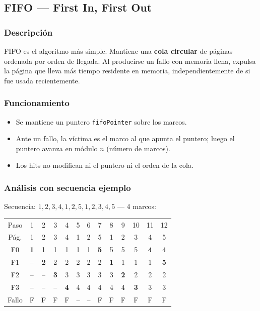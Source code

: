 \documentclass[12pt, a4paper]{article}
\begin{document}
\subsection{FIFO — First In, First Out}

\subsubsection{Descripción}

FIFO es el algoritmo más simple. Mantiene una \textbf{cola circular} de páginas ordenada por orden de llegada. Al producirse un fallo con memoria llena, expulsa la página que lleva más tiempo residente en memoria, independientemente de si fue usada recientemente.

\subsubsection{Funcionamiento}

\begin{itemize}
  \item Se mantiene un puntero \texttt{fifoPointer} sobre los marcos.
  \item Ante un fallo, la víctima es el marco al que apunta el puntero; luego el puntero avanza en módulo \(n\) (número de marcos).
  \item Los hits no modifican ni el puntero ni el orden de la cola.
\end{itemize}

\subsubsection{Análisis con secuencia ejemplo}

Secuencia: \(1,2,3,4,1,2,5,1,2,3,4,5\) — 4 marcos:

\begin{center}
\small
\begin{tabular}{ccccccccccccc}
  \toprule
  Paso  & 1 & 2 & 3 & 4 & 5 & 6 & 7 & 8 & 9 & 10 & 11 & 12 \\
  Pág.  & 1 & 2 & 3 & 4 & 1 & 2 & 5 & 1 & 2 & 3  & 4  & 5  \\
  \midrule
  F0 & \textbf{1} & 1 & 1 & 1 & 1 & 1 & \textbf{5} & 5 & 5 & 5  & \textbf{4}  & 4  \\
  F1 & -- & \textbf{2} & 2 & 2 & 2 & 2 & 2 & \textbf{1} & 1 & 1  & 1   & \textbf{5}  \\
  F2 & -- & -- & \textbf{3} & 3 & 3 & 3 & 3 & 3 & \textbf{2} & 2  & 2   & 2  \\
  F3 & -- & -- & -- & \textbf{4} & 4 & 4 & 4 & 4 & 4 & \textbf{3}  & 3   & 3  \\
  \midrule
  Fallo & F & F & F & F & -- & -- & F & F & F & F  & F  & F  \\
  \bottomrule
\end{tabular}
\end{center}
\end{document}
